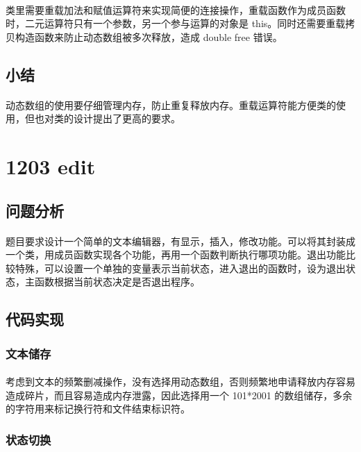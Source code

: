 \documentclass[UTF-8, 12pt]{ctexart}
\begin{document}
    \paragraph{}
    类里需要重载加法和赋值运算符来实现简便的连接操作，重载函数作为成员函数时，二元运算符只有一个参数，另一个参与运算的对象是 this。同时还需要重载拷贝构造函数来防止动态数组被多次释放，造成 double free 错误。
    \subsection{小结}
    \paragraph{}
    动态数组的使用要仔细管理内存，防止重复释放内存。重载运算符能方便类的使用，但也对类的设计提出了更高的要求。
    
\section{1203 edit}
    \subsection{问题分析}
    \paragraph{}
    题目要求设计一个简单的文本编辑器，有显示，插入，修改功能。可以将其封装成一个类，用成员函数实现各个功能，再用一个函数判断执行哪项功能。退出功能比较特殊，可以设置一个单独的变量表示当前状态，进入退出的函数时，设为退出状态，主函数根据当前状态决定是否退出程序。
    \subsection{代码实现}
        \subsubsection{文本储存}
        \paragraph{}
        考虑到文本的频繁删减操作，没有选择用动态数组，否则频繁地申请释放内存容易造成碎片，而且容易造成内存泄露，因此选择用一个 101*2001 的数组储存，多余的字符用来标记换行符和文件结束标识符。
        \subsubsection{状态切换}
\end{document}
